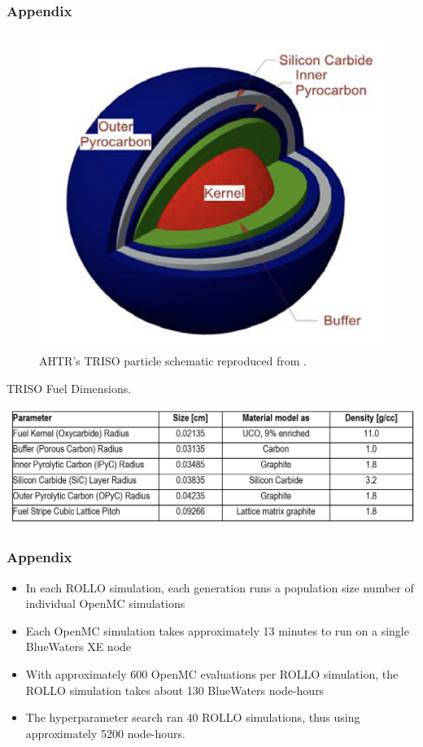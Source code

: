 \begin{frame}
    \frametitle{Appendix}
    \begin{figure}[]
        \centering
        \includegraphics[width=0.35\linewidth]{../docs/figures/ahtr-triso.png} 
        \caption{AHTR's TRISO particle schematic reproduced from 
        \cite{noauthor_fluoride_nodate}.}
    \end{figure}
    \vspace{-0.5cm}
    \begin{table}
        \caption{TRISO Fuel Dimensions.}
        \includegraphics[width=0.55\linewidth]{figures/triso-dimensions.png} 
    \end{table}
\end{frame}

\begin{frame}
    \frametitle{Appendix}
    \begin{itemize}
        \item  In each ROLLO simulation, each generation runs a population size 
        number of individual OpenMC simulations
        \item Each OpenMC simulation takes approximately 13 minutes to run on 
        a single BlueWaters XE node
        \item With approximately 600 OpenMC evaluations per ROLLO simulation, the
        ROLLO simulation takes about 130 BlueWaters node-hours
        \item The hyperparameter search ran 40 ROLLO simulations, thus using 
        approximately 5200 node-hours.
    \end{itemize}
\end{frame}